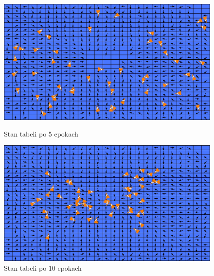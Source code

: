 \documentclass{article}
\begin{document}
    \begin{figure}[H]
        \begin{minipage}[h]{0.48\textwidth}
            \centering
            \includegraphics[width=\textwidth]{4_Qtable_after_5rd_epoch.jpg}
            \caption{Stan tabeli po 5 epokach}
        \end{minipage}
        \hspace{0.02\textwidth}
        \begin{minipage}[h]{0.48\textwidth}
            \centering
            \includegraphics[width=\textwidth]{5_Qtable_after_10th_epoch.jpg}
            \caption{Stan tabeli po 10 epokach}
        \end{minipage}
    \end{figure}
\end{document}

